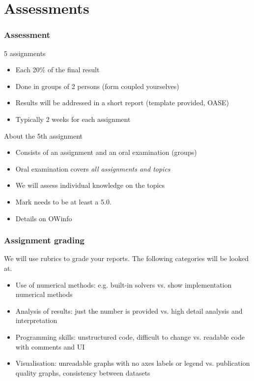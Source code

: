 \documentclass[11pt,table,final,fleqn,xcolor={usenames,dvipsnames}]{beamer}
\begin{document}
\section{Assessments}
\begin{frame}
 \frametitle{Assessment}
 \begin{block}{5 assignments}
  \begin{itemize}
    \item Each 20\% of the final result
    \item Done in groups of 2 persons (form coupled yourselves)
    \item Results will be addressed in a short report (template provided, OASE)
    \item Typically 2 weeks for each assignment
  \end{itemize}   
 \end{block}
 \pause
 \begin{block}{About the 5th assignment}
  \begin{itemize}
    \item Consists of an assignment and an oral examination (groups)
    \item Oral examination covers \emph{all assignments and topics}
    \item We will assess individual knowledge on the topics
    \item Mark needs to be at least a 5.0. 
    \item Details on OWinfo
  \end{itemize}   
 \end{block}
\end{frame} 
\begin{frame}
 \frametitle{Assignment grading}
 We will use rubrics to grade your reports. The following categories will be looked at. \pause
    \begin{itemize}[<+->]
    	\item Use of numerical methods: e.g. built-in solvers vs. show implementation numerical methods
    	\item Analysis of results: just the number is provided vs. high detail analysis and interpretation
    	\item Programming skills: unstructured code, difficult to change vs. readable code with comments and UI
    	\item Visualisation: unreadable graphs with no axes labels or legend vs. publication quality graphs, consistency between datasets
    \end{itemize} 
    \vspace*{2em} \pause
\end{frame}
\end{document}
